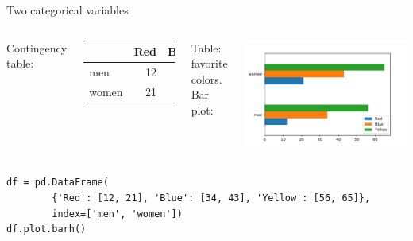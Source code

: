 \documentclass[aspectratio=169,usenames,dvipsnames]{beamer}
\begin{document}
\begin{frame}[fragile]{Two categorical variables}
    \begin{columns}[T]
            Contingency table:
            \vspace{1em}

            \begin{tabular}{lrrr}
                & Red & Blue & Yellow \\ \midrule
            men   & 12  & 34 & 56 \\
            women & 21  & 43 & 65 \\
            \end{tabular}

            \vspace{1em}
            Table: favorite colors.
            Bar plot:

            \includegraphics[width=\linewidth]{fig/barcatcont}
    \end{columns}
\begin{lstlisting}
df = pd.DataFrame(
        {'Red': [12, 21], 'Blue': [34, 43], 'Yellow': [56, 65]},
        index=['men', 'women'])
df.plot.barh()
\end{lstlisting}
\end{frame}
\end{document}

